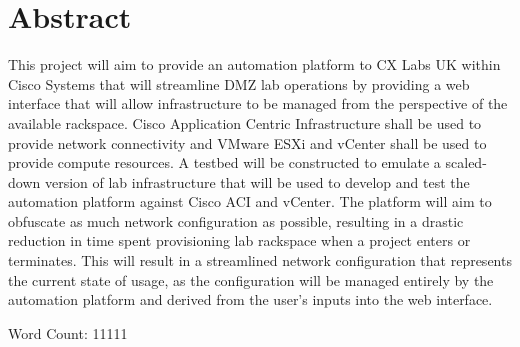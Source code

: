 \section*{Abstract}
This project will aim to provide an automation platform to CX Labs UK within Cisco Systems that will streamline DMZ lab operations by providing a web interface that will allow infrastructure to be managed from the perspective of the available rackspace. Cisco Application Centric Infrastructure shall be used to provide network connectivity and VMware ESXi and vCenter shall be used to provide compute resources. A testbed will be constructed to emulate a scaled-down version of lab infrastructure that will be used to develop and test the automation platform against Cisco ACI and vCenter. The platform will aim to obfuscate as much network configuration as possible, resulting in a drastic reduction in time spent provisioning lab rackspace when a project enters or terminates. This will result in a streamlined network configuration that represents the current state of usage, as the configuration will be managed entirely by the automation platform and derived from the user's inputs into the web interface.



Word Count: 11111